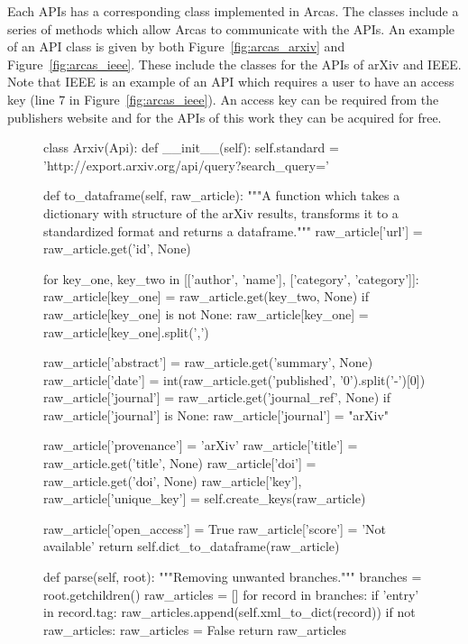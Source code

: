Each APIs has a corresponding class implemented in Arcas. The classes include
a series of methods which allow Arcas to communicate with the APIs. An example
of an API class is given by both Figure~\ref{fig:arcas_arxiv} and Figure~\ref{fig:arcas_ieee}.
These include the classes for the APIs of arXiv and IEEE. Note that IEEE is
an example of an API which requires a user to have an access key
(line 7 in Figure~\ref{fig:arcas_ieee}). An access key can be required from the
publishers website and for the APIs of this work they can be acquired for free.

\begin{figure}[!hbtp]
    \begin{sourcepy}
class Arxiv(Api):
    def __init__(self):
        self.standard = 'http://export.arxiv.org/api/query?search_query='

    def to_dataframe(self, raw_article):
        """A function which takes a dictionary with structure of the arXiv results,
        transforms it to a standardized format and returns a dataframe."""
        raw_article['url'] = raw_article.get('id', None)

        for key_one, key_two in [['author', 'name'], ['category', 'category']]:
            raw_article[key_one] = raw_article.get(key_two, None)
            if raw_article[key_one] is not None:
                raw_article[key_one] = raw_article[key_one].split(',')

        raw_article['abstract'] = raw_article.get('summary', None)
        raw_article['date'] = int(raw_article.get('published', '0').split('-')[0])
        raw_article['journal'] = raw_article.get('journal_ref', None)
        if raw_article['journal'] is None:
            raw_article['journal'] = "arXiv"

        raw_article['provenance'] = 'arXiv'
        raw_article['title'] = raw_article.get('title', None)
        raw_article['doi'] = raw_article.get('doi', None)
        raw_article['key'], raw_article['unique_key'] = self.create_keys(raw_article)

        raw_article['open_access'] = True
        raw_article['score'] = 'Not available'
        return self.dict_to_dataframe(raw_article)

    def parse(self, root):
        """Removing unwanted branches."""
        branches = root.getchildren()
        raw_articles = []
        for record in branches:
            if 'entry' in record.tag:
                raw_articles.append(self.xml_to_dict(record))
        if not raw_articles:
            raw_articles = False
        return raw_articles


\end{sourcepy}
\end{figure}
